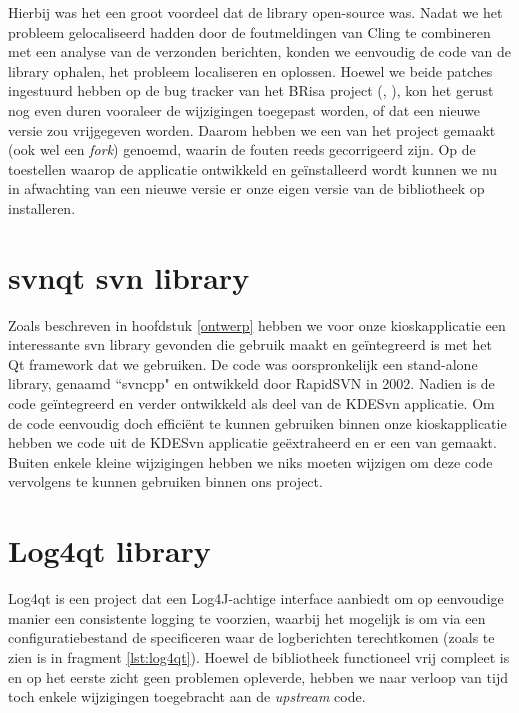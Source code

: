 Hierbij was het een groot voordeel dat de library open-source was. Nadat we het probleem gelocaliseerd hadden door de foutmeldingen van Cling te combineren met een analyse van de verzonden berichten, konden we eenvoudig de code van de library ophalen, het probleem localiseren en oplossen. Hoewel we beide patches ingestuurd hebben op de bug tracker van het BRisa project (, ), kon het gerust nog even duren vooraleer de wijzigingen toegepast worden, of dat een nieuwe versie zou vrijgegeven worden. Daarom hebben we een  van het project gemaakt (ook wel een \emph{fork}) genoemd, waarin de fouten reeds gecorrigeerd zijn. Op de toestellen waarop de applicatie ontwikkeld en geïnstalleerd wordt kunnen we nu in afwachting van een nieuwe versie er onze eigen versie van de bibliotheek op installeren.

\section{svnqt \acs{svn} library}
\label{kiosk:realisatie:svnqt}

Zoals beschreven in hoofdstuk \ref{ontwerp} hebben we voor onze kioskapplicatie een interessante \ac{svn} library gevonden die gebruik maakt en geïntegreerd is met het Qt framework dat we gebruiken. De code was oorspronkelijk een stand-alone library, genaamd ``svncpp" en ontwikkeld door RapidSVN in 2002. Nadien is de code geïntegreerd en verder ontwikkeld als deel van de KDESvn applicatie. Om de code eenvoudig doch efficiënt te kunnen gebruiken binnen onze kioskapplicatie hebben we code uit de KDESvn applicatie geëxtraheerd en er een  van gemaakt. Buiten enkele kleine wijzigingen hebben we niks moeten wijzigen om deze code vervolgens te kunnen gebruiken binnen ons project.

\section{Log4qt library}
\label{kiosk:realisatie:log4qt}

Log4qt is een project dat een Log4J-achtige interface aanbiedt om op eenvoudige manier een consistente logging te voorzien, waarbij het mogelijk is om via een configuratiebestand de specificeren waar de logberichten terechtkomen (zoals te zien is in fragment \ref{lst:log4qt}). Hoewel de bibliotheek functioneel vrij compleet is en op het eerste zicht geen problemen opleverde, hebben we naar verloop van tijd toch enkele wijzigingen toegebracht aan de \emph{upstream} code.

